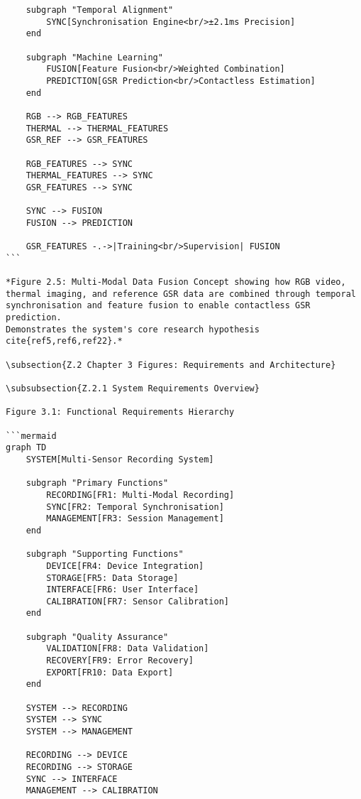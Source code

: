 \begin{verbatim}
    subgraph "Temporal Alignment"
        SYNC[Synchronisation Engine<br/>±2.1ms Precision]
    end

    subgraph "Machine Learning"
        FUSION[Feature Fusion<br/>Weighted Combination]
        PREDICTION[GSR Prediction<br/>Contactless Estimation]
    end

    RGB --> RGB_FEATURES
    THERMAL --> THERMAL_FEATURES
    GSR_REF --> GSR_FEATURES

    RGB_FEATURES --> SYNC
    THERMAL_FEATURES --> SYNC
    GSR_FEATURES --> SYNC

    SYNC --> FUSION
    FUSION --> PREDICTION

    GSR_FEATURES -.->|Training<br/>Supervision| FUSION
```

*Figure 2.5: Multi-Modal Data Fusion Concept showing how RGB video,
thermal imaging, and reference GSR data are combined through temporal
synchronisation and feature fusion to enable contactless GSR prediction.
Demonstrates the system's core research hypothesis cite{ref5,ref6,ref22}.*

\subsection{Z.2 Chapter 3 Figures: Requirements and Architecture}

\subsubsection{Z.2.1 System Requirements Overview}

Figure 3.1: Functional Requirements Hierarchy

```mermaid
graph TD
    SYSTEM[Multi-Sensor Recording System]

    subgraph "Primary Functions"
        RECORDING[FR1: Multi-Modal Recording]
        SYNC[FR2: Temporal Synchronisation]
        MANAGEMENT[FR3: Session Management]
    end

    subgraph "Supporting Functions"
        DEVICE[FR4: Device Integration]
        STORAGE[FR5: Data Storage]
        INTERFACE[FR6: User Interface]
        CALIBRATION[FR7: Sensor Calibration]
    end

    subgraph "Quality Assurance"
        VALIDATION[FR8: Data Validation]
        RECOVERY[FR9: Error Recovery]
        EXPORT[FR10: Data Export]
    end

    SYSTEM --> RECORDING
    SYSTEM --> SYNC
    SYSTEM --> MANAGEMENT

    RECORDING --> DEVICE
    RECORDING --> STORAGE
    SYNC --> INTERFACE
    MANAGEMENT --> CALIBRATION


\end{verbatim}
